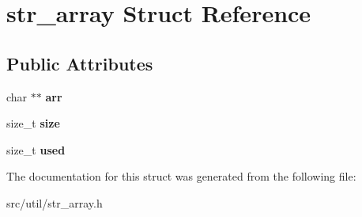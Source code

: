 \hypertarget{structstr__array}{}\section{str\+\_\+array Struct Reference}
\label{structstr__array}
\subsection*{Public Attributes}
\begin{DoxyCompactItemize}
\item 
\mbox{\label{structstr__array_a19242a7c35c6e1313f7499c51051ed9a}} 
char $\ast$$\ast$ {\bfseries arr}
\item 
\mbox{\label{structstr__array_ac668db01aa69290943b464e74ec49897}} 
size\+\_\+t {\bfseries size}
\item 
\mbox{\label{structstr__array_a10a3614f5d66821cf9c3b7be30edc854}} 
size\+\_\+t {\bfseries used}
\end{DoxyCompactItemize}


The documentation for this struct was generated from the following file\+:\begin{DoxyCompactItemize}
\item 
src/util/str\+\_\+array.\+h\end{DoxyCompactItemize}
